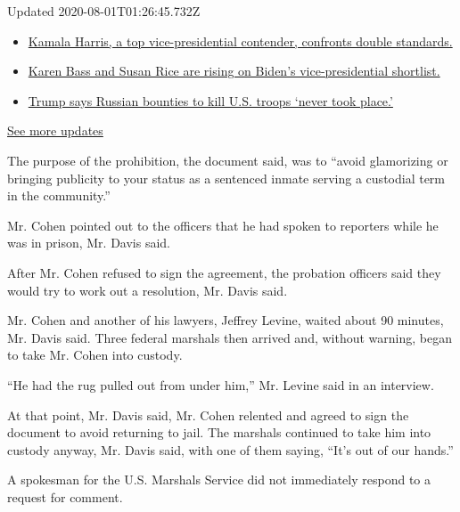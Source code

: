 Updated 2020-08-01T01:26:45.732Z

\begin{itemize}
\tightlist
\item
  \href{https://www.nytimes.com/2020/07/31/us/elections/biden-vs-trump.html?action=click\&pgtype=Article\&state=default\&region=MAIN_CONTENT_1\&context=storylines_live_updates\#link-29fdff45}{Kamala
  Harris, a top vice-presidential contender, confronts double
  standards.}
\item
  \href{https://www.nytimes.com/2020/07/31/us/elections/biden-vs-trump.html?action=click\&pgtype=Article\&state=default\&region=MAIN_CONTENT_1\&context=storylines_live_updates\#link-13ec3d9c}{Karen
  Bass and Susan Rice are rising on Biden's vice-presidential
  shortlist.}
\item
  \href{https://www.nytimes.com/2020/07/31/us/elections/biden-vs-trump.html?action=click\&pgtype=Article\&state=default\&region=MAIN_CONTENT_1\&context=storylines_live_updates\#link-49e9a016}{Trump
  says Russian bounties to kill U.S. troops `never took place.'}
\end{itemize}

\href{https://www.nytimes.com/2020/07/31/us/elections/biden-vs-trump.html?action=click\&pgtype=Article\&state=default\&region=MAIN_CONTENT_1\&context=storylines_live_updates}{See
more updates}

The purpose of the prohibition, the document said, was to ``avoid
glamorizing or bringing publicity to your status as a sentenced inmate
serving a custodial term in the community.''

Mr. Cohen pointed out to the officers that he had spoken to reporters
while he was in prison, Mr. Davis said.

After Mr. Cohen refused to sign the agreement, the probation officers
said they would try to work out a resolution, Mr. Davis said.

Mr. Cohen and another of his lawyers, Jeffrey Levine, waited about 90
minutes, Mr. Davis said. Three federal marshals then arrived and,
without warning, began to take Mr. Cohen into custody.

``He had the rug pulled out from under him,'' Mr. Levine said in an
interview.

At that point, Mr. Davis said, Mr. Cohen relented and agreed to sign the
document to avoid returning to jail. The marshals continued to take him
into custody anyway, Mr. Davis said, with one of them saying, ``It's out
of our hands.''

A spokesman for the U.S. Marshals Service did not immediately respond to
a request for comment.


